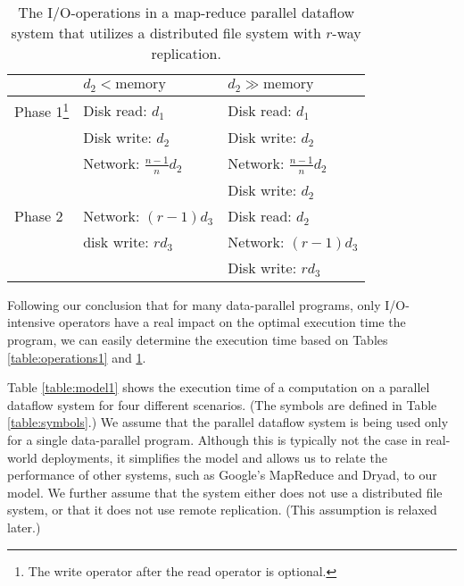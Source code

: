 \documentclass[ 11pt, letterpaper]{article}%
\begin{document}
\begin{table}
\centering
\begin{minipage}{1\textwidth}
\centering
\renewcommand{\arraystretch}{1.2}
\begin{tabular}{|l|l|l|}
\hline
        & $d_2 < \text{memory}$           & $d_2 \gg \text{memory}$ \\ \hline
Phase 1\footnote{The write operator after the read operator is optional.} &
Disk read: $d_1$                & Disk read: $d_1$ \\ & Disk write: $d_2$ & Disk write: $d_2$ \\
        & Network: $\frac{n-1}{n} d_2$    & Network: $\frac{n-1}{n} d_2$ \\
        &                                 & Disk write: $d_2$ \\ \hline
Phase 2 & Network: $\left(r-1\right) d_3$ & Disk read: $d_2$ \\
        & disk write: $r d_3$             & Network: $\left(r-1\right) d_3$ \\
        &                                 & Disk write: $r d_3$ \\
        \hline
\end{tabular}
\caption{The I/O-operations in a map-reduce parallel dataflow system that utilizes a distributed file system with $r$-way replication.}
\label{table:operations2}
\end{minipage}
\end{table}

Following our conclusion that for many data-parallel programs, only
I/O-intensive operators have a real impact on the optimal execution time the
program, we can easily determine the execution time based on Tables
\ref{table:operations1} and \ref{table:operations2}.

Table \ref{table:model1} shows the execution time of a computation on a
parallel dataflow system for four different scenarios. (The symbols are defined
in Table \ref{table:symbols}.) We assume that the parallel dataflow system is
being used only for a single data-parallel program. Although this is typically
not the case in real-world deployments, it simplifies the model and allows us
to relate the performance of other systems, such as Google's MapReduce and
Dryad, to our model. We further assume that the system either does not
use a distributed file system, or that it does not use remote replication. (This
assumption is relaxed later.)
\end{document}
